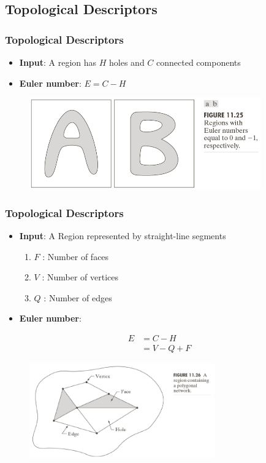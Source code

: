 \documentclass[english,11pt,table,handout]{beamer}
\begin{document}
\subsection{Topological Descriptors}
\frame
{
	\frametitle{Topological Descriptors}
	\large
	\begin{itemize}
		\item \textbf{Input}: A region has $H$ holes and $C$ connected components
		\item \textbf{Euler number}: $E = C - H$
	\end{itemize}
	
	
	\begin{figure}[!h]
		\includegraphics[width=10cm]{euler_number.png}
	\end{figure}
}

\frame
{
	\frametitle{Topological Descriptors}
	\large
	\begin{itemize}
		\item \textbf{Input}: A Region represented by straight-line segments
			\begin{enumerate}
				\item $F$ : Number of faces
				\item $V$ : Number of vertices
				\item $Q$ : Number of edges
			\end{enumerate}
		\item \textbf{Euler number}: 
	\end{itemize}
	\begin{equation}
		\begin{split}
		\nonumber
			E  &= C - H \\
			   &= V - Q + F
		\end{split}
	\end{equation}
	
	\begin{figure}[!h]
		\includegraphics[width=8cm]{euler_number2.png}
	\end{figure}
}
\end{document}
